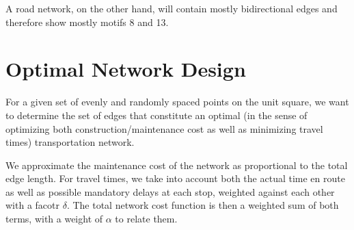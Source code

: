 \documentclass{scrartcl}
\begin{document}
A road network, on the other hand, will contain mostly bidirectional edges and therefore show mostly motifs 8 and 13. 

\section{Optimal Network Design}
For a given set of evenly and randomly spaced points on the unit square, we want to determine the set of edges that constitute an optimal (in the sense of optimizing both construction/maintenance cost as well as minimizing travel times) transportation network.

We approximate the maintenance cost of the network as proportional to the total edge length. For travel times, we take into account both the actual time en route as well as possible mandatory delays at each stop, weighted against each other with a facotr $\delta$. The total network cost function is then a weighted sum of both terms, with a weight of $\alpha$ to relate them.  
 
\end{document}
